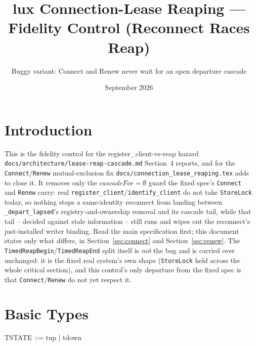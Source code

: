 \documentclass[a4paper,10pt,fleqn]{article}
\begin{document}
\title{lux Connection-Lease Reaping --- Fidelity Control (Reconnect Races
  Reap)}
\author{Buggy variant: Connect and Renew never wait for an open departure
  cascade}
\date{September 2026}
\maketitle

\section{Introduction}

This is the fidelity control for the register\_client-vs-reap hazard
\texttt{docs/architecture/lease-reap-cascade.md} Section~4 reports, and
for the \texttt{Connect}/\texttt{Renew} mutual-exclusion fix
\texttt{docs/connection\_lease\_reaping.tex} adds to close it. It removes
only the \texttt{$cascadeFor = \emptyset$} guard the fixed spec's
\texttt{Connect} and \texttt{Renew} carry: real
\texttt{register\_client}/\texttt{identify\_client} do not take
\texttt{StoreLock} today, so nothing stops a same-identity reconnect from
landing between \texttt{\_depart\_lapsed}'s registry-and-ownership removal
and its cascade tail, while that tail -- decided against stale
information -- still runs and wipes out the reconnect's just-installed
writer binding. Read the main specification first; this document states
only what differs, in Section~\ref{sec:connect} and
Section~\ref{sec:renew}. The \texttt{TimedReapBegin}/\texttt{TimedReapEnd}
split itself is \emph{not} the bug and is carried over unchanged: it is
the fixed real system's own shape (\texttt{StoreLock} held across the
whole critical section), and this control's only departure from the fixed
spec is that \texttt{Connect}/\texttt{Renew} do not yet respect it.

\section{Basic Types}

\begin{zed}
\end{zed}

\begin{zed}
  TSTATE ::= tup | tdown
\end{zed}
\end{document}
